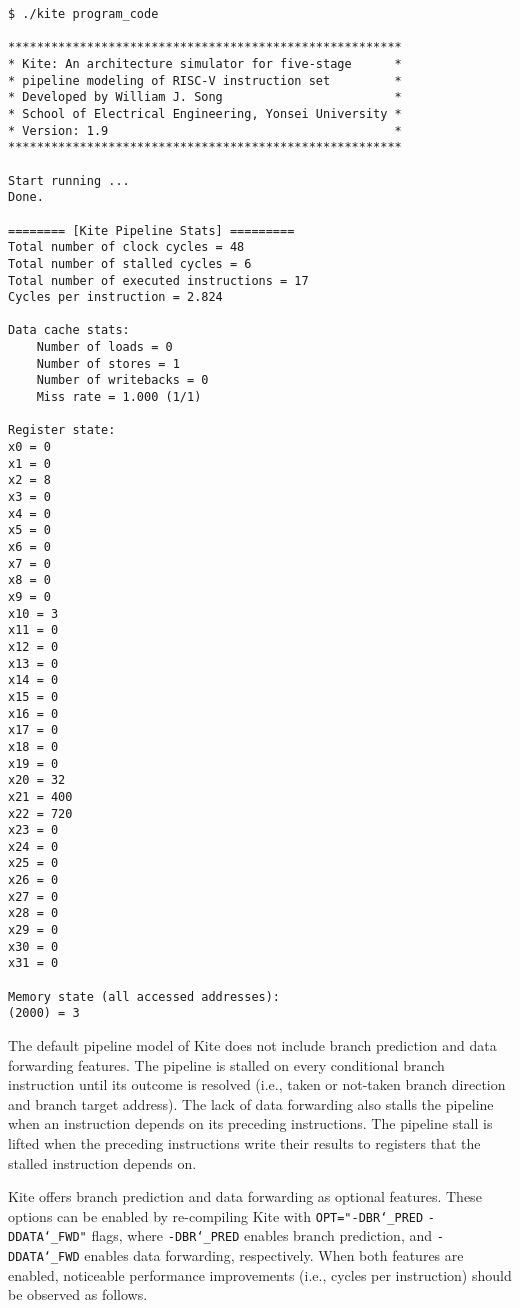 \documentclass[10pt]{article}
\begin{document}
\begin{Verbatim}[frame=single]
$ ./kite program_code

*******************************************************
* Kite: An architecture simulator for five-stage      *
* pipeline modeling of RISC-V instruction set         *
* Developed by William J. Song                        *
* School of Electrical Engineering, Yonsei University *
* Version: 1.9                                        *
*******************************************************

Start running ...
Done.

======== [Kite Pipeline Stats] =========
Total number of clock cycles = 48
Total number of stalled cycles = 6
Total number of executed instructions = 17
Cycles per instruction = 2.824

Data cache stats:
    Number of loads = 0
    Number of stores = 1
    Number of writebacks = 0
    Miss rate = 1.000 (1/1)

Register state:
x0 = 0
x1 = 0
x2 = 8
x3 = 0
x4 = 0
x5 = 0
x6 = 0
x7 = 0
x8 = 0
x9 = 0
x10 = 3
x11 = 0
x12 = 0
x13 = 0
x14 = 0
x15 = 0
x16 = 0
x17 = 0
x18 = 0
x19 = 0
x20 = 32
x21 = 400
x22 = 720
x23 = 0
x24 = 0
x25 = 0
x26 = 0
x27 = 0
x28 = 0
x29 = 0
x30 = 0
x31 = 0

Memory state (all accessed addresses):
(2000) = 3
\end{Verbatim}

The default pipeline model of Kite does not include branch prediction and data forwarding features.
The pipeline is stalled on every conditional branch instruction until its outcome is resolved (i.e., taken or not-taken branch direction and branch target address).
The lack of data forwarding also stalls the pipeline when an instruction depends on its preceding instructions.
The pipeline stall is lifted when the preceding instructions write their results to registers that the stalled instruction depends on.

Kite offers branch prediction and data forwarding as optional features.
These options can be enabled by re-compiling Kite with {\tt OPT="-DBR\char`_PRED} {\tt -DDATA\char`_FWD"} flags, where {\tt -DBR\char`_PRED} enables branch prediction, and {\tt -DDATA\char`_FWD} enables data forwarding, respectively.
When both features are enabled, noticeable performance improvements (i.e., cycles per instruction) should be observed as follows.
\end{document}
